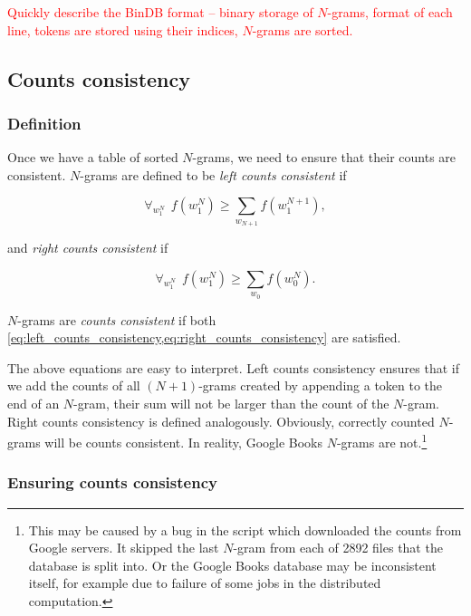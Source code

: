 \documentclass[draft]{IIBproject}
\makeatletter
\DeclareRobustCommand{\noteSelf}[1]{\textcolor{red}{#1}}
\DeclareRobustCommand{\npgrams}{\mbox{$(N{+}1)$-grams}\@\xspace}
\makeatother
\begin{document}
\noteSelf{Quickly describe the BinDB format -- binary storage of $N$-grams, format of each line, tokens are stored using their indices, $N$-grams are sorted.}

\subsection{Counts consistency}
\label{sec:counts_consistency}

\subsubsection{Definition}

Once we have a table of sorted $N$-grams, we need to ensure that their counts are consistent. $N$-grams are defined to be \emph{left counts consistent} if

\begin{equation}
\label{eq:left_counts_consistency}
\forall_{w_1^N} ~~ f(w_1^N) \ge \sum_{w_{N+1}} f(w_1^{N+1}),
\end{equation}

and \emph{right counts consistent} if

\begin{equation}
\label{eq:right_counts_consistency}
\forall_{w_1^N} ~~ f(w_1^N) \ge \sum_{w_0} f(w_0^N).
\end{equation}

$N$-grams are \emph{counts consistent} if both \cref{eq:left_counts_consistency,eq:right_counts_consistency} are satisfied.

The above equations are easy to interpret. Left counts consistency ensures that if we add the counts of all \npgrams created by appending a token to the end of an $N$-gram, their sum will not be larger than the count of the $N$-gram. Right counts consistency is defined analogously. Obviously, correctly counted $N$-grams will be counts consistent. In reality, Google Books $N$-grams are not.\footnote{This may be caused by a bug in the script which downloaded the counts from Google servers. It skipped the last $N$-gram from each of 2892 files that the database is split into. Or the Google Books database may be inconsistent itself, for example due to failure of some jobs in the distributed computation.}

\subsubsection{Ensuring counts consistency}
\end{document}
